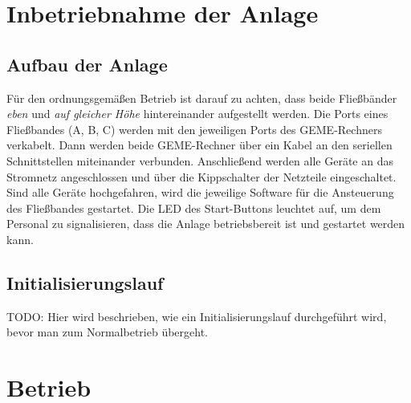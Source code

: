 \documentclass[oneside,a4paper,titlepage]{scrartcl} %
\begin{document}
\section{Inbetriebnahme der Anlage}
\subsection{Aufbau der Anlage}
Für den ordnungsgemäßen Betrieb ist darauf zu achten, dass beide Fließbänder \emph{eben} und \emph{auf gleicher Höhe} hintereinander aufgestellt werden.\newline
\newline
Die Ports eines Fließbandes (A, B, C) werden mit den jeweiligen Ports des GEME-Rechners verkabelt.\newline
\newline
Dann werden beide GEME-Rechner über ein Kabel an den seriellen Schnittstellen miteinander verbunden.\newline
\newline
Anschließend werden alle Geräte an das Stromnetz angeschlossen und über die Kippschalter der Netzteile eingeschaltet.\newline
\newline
Sind alle Geräte hochgefahren, wird die jeweilige Software für die Ansteuerung des Fließbandes gestartet.\newline
\newline
Die LED des Start-Buttons leuchtet auf, um dem Personal zu signalisieren, dass die Anlage betriebsbereit ist und gestartet werden kann.

\subsection{Initialisierungslauf}
TODO: Hier wird beschrieben, wie ein Initialisierungslauf durchgeführt wird, bevor man zum Normalbetrieb übergeht.

\newpage

\section{Betrieb}
\end{document}
